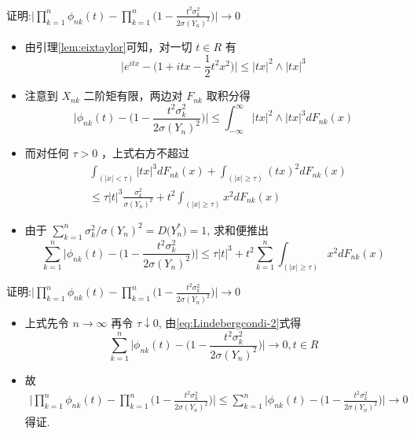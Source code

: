 	\begin{frame}{证明:$\big|\prod_{k=1}^{n} \phi_{n k}(t)-\prod_{k=1}^{n}\big(1-\frac{t^{2} \sigma_{k}^{2}}{2 \sigma(Y_n)^2}\big)\big| \rightarrow 0$}
		\vspace{-0.1cm}
		\begin{itemize}
			\item 由引理\ref{lem:eixtaylor}可知，对一切 $t \in R$ 有
		\[
		\big|e^{i t x}-\big(1+i t x-\frac{1}{2} t^{2} x^{2}\big)\big| \leq|t x|^{2} \wedge|t x|^{3}
		\]
		\item 注意到 $X_{nk}$ 二阶矩有限，两边对 $F_{n k}$ 取积分得
		\[
		\big|\phi_{n k}(t)-\big(1-\frac{t^{2} \sigma_{k}^{2}}{2 \sigma(Y_n)^{2}}\big)\big| \leq \int_{-\infty}^\infty |tx|^2\wedge |tx|^3dF_{nk}(x)%
		\]
		\item 而对任何 $\tau>0$ ，上式右方不超过
		\begin{align*}
			&\int_{(|x|<\tau)}|t x|^{3} d F_{n k}(x)+\int_{(|x| \geq \tau)}(t x)^{2} d F_{n k}(x)\\
			&\leq \tau|t|^{3} \frac{\sigma_{k}^{2}}{\sigma(Y_n)^{2}}+t^{2} \int_{(|x| \geq \tau)} x^{2} d F_{n k}(x)
		\end{align*}
		\item 由于 $\sum_{k=1}^{n} \sigma_{k}^{2} / \sigma(Y_n)^{2}=D\big(Y_n^*\big)=1$, 求和便推出
		\[
		\sum_{k=1}^{n}\big|\phi_{n k}(t)-\big(1-\frac{t^{2} \sigma_{k}^{2}}{2 \sigma(Y_n)^{2}}\big)\big| \leq \tau|t|^{3}+t^{2} \sum_{k=1}^{n} \int_{(|x| \geq \tau)} x^{2} d F_{n k}(x)
		\]
		\end{itemize}
	\end{frame}

	\begin{frame}{证明:$\big|\prod_{k=1}^{n} \phi_{n k}(t)-\prod_{k=1}^{n}\big(1-\frac{t^{2} \sigma_{k}^{2}}{2 \sigma(Y_n)^2}\big)\big| \rightarrow 0$}
\begin{itemize}
	\item 上式先令 $n \rightarrow \infty$ 再令 $\tau \downarrow 0$, 由\eqref{eq:Lindebergcondi-2}式得
	\[
	\sum_{k=1}^{n}\big|\phi_{n k}(t)-\big(1-\frac{t^{2} \sigma_{k}^{2}}{2 \sigma(Y_n)^2}\big)\big| \rightarrow 0,  t \in R
	\]
	\item 故
	\begin{align*}
		\big|\prod_{k=1}^{n} \phi_{n k}(t)-\prod_{k=1}^{n}\big(1-\frac{t^{2} \sigma_{k}^{2}}{2 \sigma(Y_n)^2}\big)\big|\leq  \sum_{k=1}^{n}\big|\phi_{n k}(t)-\big(1-\frac{t^{2} \sigma_{k}^{2}}{2 \sigma(Y_n)^2}\big)\big| \rightarrow 0
	\end{align*}得证.
\end{itemize}
	\end{frame}

